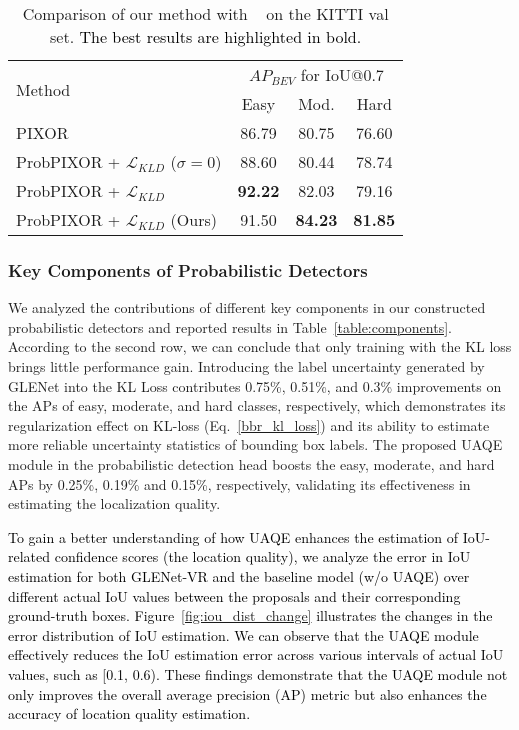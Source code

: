 \documentclass[twocolumn]{svjour3}
\newcommand{\revise}[1]{\textcolor{black}{#1}}
\begin{document}
\setlength{\tabcolsep}{4pt}
\begin{table}[htp]
\centering
\caption{Comparison of our method with ~\citep{feng_iros} on the KITTI val set. \revise{The best results are highlighted in bold.}}
\label{table:compare_35}
\begin{tabular}{l|ccc} 
\toprule
\multirow{2}{*}{Method}                    & \multicolumn{3}{c}{$AP_{BEV}$ for IoU@0.7}  \\
                                           & Easy  & Mod.  & Hard                        \\ 
\hline
PIXOR~\citep{yang2018pixor}                 					   & 86.79  & 80.75    & 76.60     \\
ProbPIXOR + $\mathcal{L}_{KLD}$ ($\sigma=0$)      & 88.60  & 80.44    & 78.74     \\
ProbPIXOR + $\mathcal{L}_{KLD}$ \citep{feng_iros}    & \textbf{92.22} & 82.03    & 79.16     \\
ProbPIXOR + $\mathcal{L}_{KLD}$ (Ours)          & 91.50  & \textbf{84.23}    & \textbf{81.85}     \\
\bottomrule
\end{tabular}
\end{table}
\setlength{\tabcolsep}{1.5pt}


\subsubsection{Key Components of Probabilistic Detectors} We analyzed the contributions of different key components in our constructed probabilistic detectors and reported results in Table~\ref{table:components}. According to the second row, we can conclude that only training with the KL loss brings little performance gain. Introducing the label uncertainty generated by GLENet into the KL Loss contributes 0.75\%, 0.51\%, and 0.3\% improvements on the APs of easy, moderate, and hard classes, respectively, which demonstrates its regularization effect on KL-loss (Eq.~\ref{bbr_kl_loss}) and its ability to estimate more reliable uncertainty statistics of bounding box labels. The proposed UAQE module in the probabilistic detection head boosts the easy, moderate, and hard APs by 0.25\%, 0.19\% and 0.15\%, respectively, validating its effectiveness in estimating the localization quality.

\revise{To gain a better understanding of how UAQE enhances the estimation of IoU-related confidence scores (the location quality), we analyze the error in IoU estimation for both GLENet-VR and the baseline model (w/o UAQE) over different actual IoU values between the proposals and their corresponding ground-truth boxes. Figure~\ref{fig:iou_dist_change} illustrates the changes in the error distribution of IoU estimation. We can observe that the UAQE module effectively reduces the IoU estimation error across various intervals of actual IoU values, such as [0.1, 0.6). These findings demonstrate that the UAQE module not only improves the overall average precision (AP) metric but also enhances the accuracy of location quality estimation.
}
\end{document}
